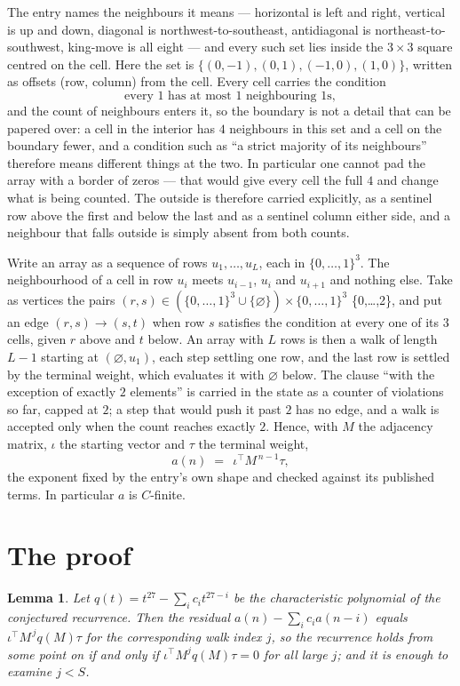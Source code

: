 \documentclass[11pt,a4paper]{article}
\theoremstyle{plain}
\newtheorem{lemma}[theorem]{Lemma}
\theoremstyle{definition}
\begin{document}
The entry names the neighbours it means --- horizontal is left and right, vertical is up and
down, diagonal is northwest-to-southeast, antidiagonal is northeast-to-southwest, king-move is
all eight --- and every such set lies inside the $3\times3$ square centred on the cell. Here
the set is $\{(0,-1), (0,1), (-1,0), (1,0)\}$, written as offsets (row, column) from the cell. Every cell carries
the condition
\[
\text{every 1 has at most 1 neighbouring 1s},
\]
and the count of neighbours enters it, so the boundary is not a detail that can be papered
over: a cell in the interior has $4$ neighbours in this set and a cell on the boundary
fewer, and a condition such as ``a strict majority of its neighbours'' therefore means
different things at the two. In particular one cannot pad the array with a border of zeros ---
that would give every cell the full $4$ and change what is being counted. The outside is
therefore carried
explicitly, as a sentinel row above the first and below the last and as a sentinel column
either side, and a neighbour that falls outside is simply absent from both counts.

Write an array as a sequence of rows $u_1,\dots,u_L$, each in
$\{0,\dots,1\}^{3}$. The neighbourhood of a cell in row $u_i$ meets $u_{i-1}$,
$u_i$ and $u_{i+1}$ and nothing else. Take as vertices the pairs
$(r,s)\in(\{0,\dots,1\}^{3}\cup\{\varnothing\})\times\{0,\dots,1\}^{3}$ \times \{0,\dots,2\},
and put an edge $(r,s)\to(s,t)$ when row $s$ satisfies the condition at every one of its
$3$ cells, given $r$ above and $t$ below. An array with $L$ rows is then a walk of length
$L-1$ starting at $(\varnothing,u_1)$, each step settling one row, and the last row is
settled by the terminal weight, which evaluates it with $\varnothing$ below. The clause ``with the exception of exactly $2$ elements'' is carried in
the state as a counter of violations so far, capped at $2$; a step that would push it past
$2$ has no edge, and a walk is accepted only when the count reaches exactly $2$. Hence,
with $M$ the adjacency matrix, $\iota$ the starting vector and $\tau$ the terminal weight,
\[
a(n)\;=\;\,\iota^{\!\top}M^{\,n-1}\tau ,
\]
the exponent fixed by the entry's own shape and checked against its published terms. In
particular $a$ is $C$-finite.

\section{The proof}

\begin{lemma}\label{lem:crit}
Let $q(t)=t^{27}-\sum_i c_it^{27-i}$ be the characteristic polynomial of the
conjectured recurrence. Then the residual $a(n)-\sum_ic_ia(n-i)$ equals
$\iota^{\!\top}M^{\,j}q(M)\tau$ for the corresponding walk index $j$, so the
recurrence holds from some point on if and only if $\iota^{\!\top}M^{j}q(M)\tau=0$ for all
large $j$; and it is enough to examine $j<S$.
\end{lemma}
\end{document}
